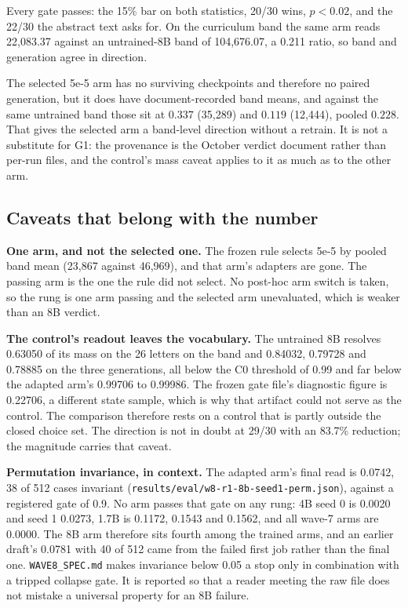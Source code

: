 \documentclass[11pt,a4paper]{article}
\begin{document}
Every gate passes: the 15\% bar on both statistics, 20/30 wins, $p<0.02$, and the 22/30 the abstract
text asks for. On the curriculum band the same arm reads 22{,}083.37 against an untrained-8B band of
104{,}676.07, a 0.211 ratio, so band and generation agree in direction.

The selected 5e-5 arm has no surviving checkpoints and therefore no paired generation, but it does
have document-recorded band means, and against the same untrained band those sit at $0.337$
(35{,}289) and $0.119$ (12{,}444), pooled $0.228$. That gives the selected arm a band-level direction
without a retrain. It is not a substitute for G1: the provenance is the October verdict document
rather than per-run files, and the control's mass caveat applies to it as much as to the other arm.

\subsection*{Caveats that belong with the number}

\textbf{One arm, and not the selected one.} The frozen rule selects 5e-5 by pooled band mean
(23{,}867 against 46{,}969), and that arm's adapters are gone. The passing arm is the one the rule did
not select. No post-hoc arm switch is taken, so the rung is one arm passing and the selected arm
unevaluated, which is weaker than an 8B verdict.

\textbf{The control's readout leaves the vocabulary.} The untrained 8B resolves 0.63050 of its mass on
the 26 letters on the band and 0.84032, 0.79728 and 0.78885 on the three generations, all below the
C0 threshold of 0.99 and far below the adapted arm's 0.99706 to 0.99986. The frozen gate file's
diagnostic figure is 0.22706, a different state sample, which is why that artifact could not serve as
the control. The comparison therefore rests on a control that is partly outside the closed choice set.
The direction is not in doubt at 29/30 with an 83.7\% reduction; the magnitude carries that caveat.

\textbf{Permutation invariance, in context.} The adapted arm's final read is 0.0742, 38 of 512
cases invariant (\texttt{results/eval/w8-r1-8b-seed1-perm.json}), against a registered gate of 0.9.
No arm passes that gate on any rung: 4B seed 0 is 0.0020 and seed 1 0.0273, 1.7B is 0.1172, 0.1543 and
0.1562, and all wave-7 arms are 0.0000. The 8B arm therefore sits fourth among the trained arms, and
an earlier draft's 0.0781 with 40 of 512 came from the failed first job rather than the final one.
\texttt{WAVE8\_SPEC.md} makes invariance below 0.05 a stop only in combination with a tripped collapse
gate. It is reported so that a reader meeting the raw file does
not mistake a universal property for an 8B failure.
\end{document}
